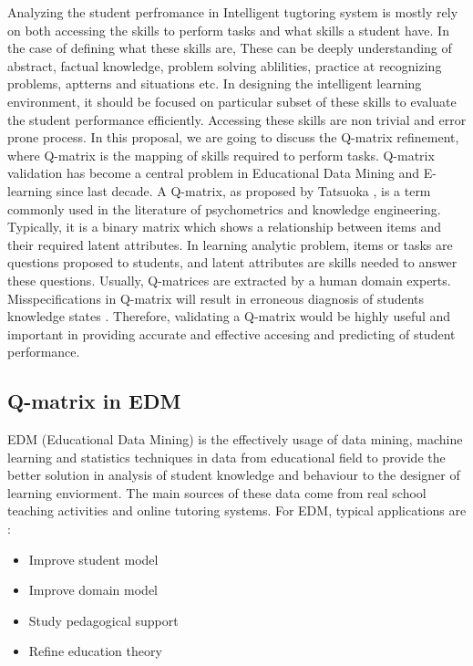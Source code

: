 \documentclass[11pt]{article}
\begin{document}
  Analyzing the student perfromance in Intelligent tugtoring system is mostly rely on both accessing the skills to perform tasks and what skills a student have. In the case of defining what these skills are, These can be deeply understanding of abstract, factual knowledge, problem solving ablilities, practice at recognizing problems, aptterns and situations etc. In designing the intelligent learning environment, it should be focused on particular subset of these skills to evaluate the student performance efficiently. Accessing these skills are non trivial and error prone process. In this proposal, we are going to discuss the Q-matrix  refinement, where Q-matrix is the mapping of skills required to perform tasks. Q-matrix validation has become a central problem in Educational Data Mining and E-learning since last decade. A Q-matrix, as proposed by Tatsuoka \cite{tatsuoka1983rule}, is a term commonly used in the literature of psychometrics and knowledge engineering. Typically, it is a binary matrix which shows a relationship between items and their required latent attributes. In learning analytic problem, items or tasks are questions proposed to students, and latent attributes are skills needed to answer these questions. Usually, Q-matrices are extracted by a human domain experts. Misspecifications in Q-matrix will result in erroneous diagnosis of students knowledge states \cite{rupp2008effects,madison2015effects}. Therefore, validating a Q-matrix would be highly useful and important in providing accurate and effective accesing and predicting of student performance. 
	\subsection{Q-matrix in EDM}
 EDM (Educational Data Mining) is the effectively usage of data mining, machine learning and statistics techniques in data from educational field to provide the better solution in analysis of student knowledge and behaviour to the designer of learning enviorment. The main sources of these data come from real school teaching activities and online tutoring systems. For EDM, typical applications are \cite{baker2009state}: 
\begin{itemize}
	\item{Improve student model}
	\item{Improve domain model}
	\item{Study pedagogical support}
	\item{Refine education theory}
\end{itemize}
\end{document}
